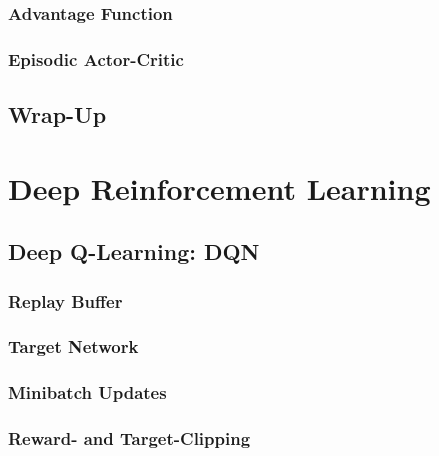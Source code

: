         \subsection{Advantage Function} %

        \subsection{Episodic Actor-Critic} %

    \section{Wrap-Up} %

\chapter{Deep Reinforcement Learning} %

    \section{Deep Q-Learning: DQN} %

        \subsection{Replay Buffer} %

        \subsection{Target Network} %

        \subsection{Minibatch Updates} %

        \subsection{Reward- and Target-Clipping} %


